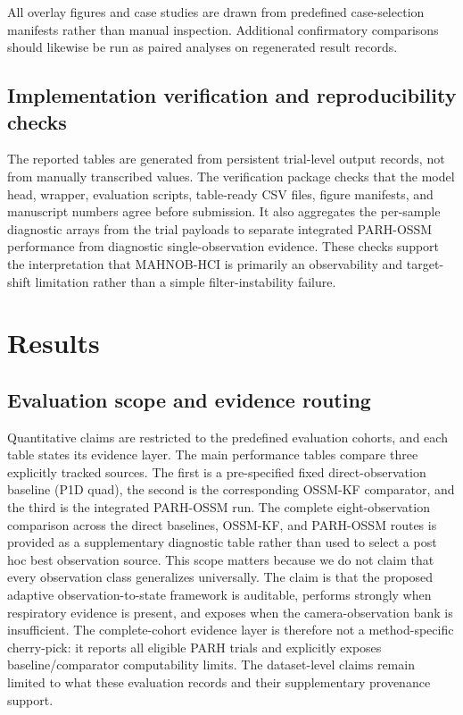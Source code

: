 \documentclass[fleqn,10pt]{wlscirep}
\begin{document}
All overlay figures and case studies are drawn from predefined case-selection
manifests rather than manual inspection. Additional confirmatory comparisons
should likewise be run as paired analyses on regenerated result records.

\subsection*{Implementation verification and reproducibility checks}
The reported tables are generated from persistent trial-level output records,
not from manually transcribed values. The verification package checks that the
model head, wrapper, evaluation scripts, table-ready CSV files, figure
manifests, and manuscript numbers agree before submission. It also aggregates
the per-sample diagnostic arrays from the trial payloads to separate integrated
PARH-OSSM performance from diagnostic single-observation evidence. These checks
support the interpretation that MAHNOB-HCI is primarily an observability and
target-shift limitation rather than a simple filter-instability failure.


\section*{Results}
\subsection*{Evaluation scope and evidence routing}
Quantitative claims are restricted to the predefined evaluation
cohorts, and each table states its evidence layer. The main performance tables
compare three explicitly tracked sources. The first is a pre-specified fixed
direct-observation baseline (P1D quad), the second is the corresponding
OSSM-KF comparator, and the third is the integrated PARH-OSSM run. The
complete eight-observation comparison across the direct baselines, OSSM-KF,
and PARH-OSSM routes is provided as a supplementary diagnostic table rather
than used to select a post hoc best observation source.
This scope matters because we do not claim that every observation class
generalizes universally. The claim is that the proposed adaptive
observation-to-state framework is auditable, performs strongly when respiratory
evidence is present, and exposes when the camera-observation bank is
insufficient. The complete-cohort evidence layer is therefore not a
method-specific cherry-pick: it reports all eligible PARH trials and explicitly exposes
baseline/comparator computability limits. The dataset-level claims remain
limited to what these evaluation records and their supplementary provenance
support.
\end{document}
